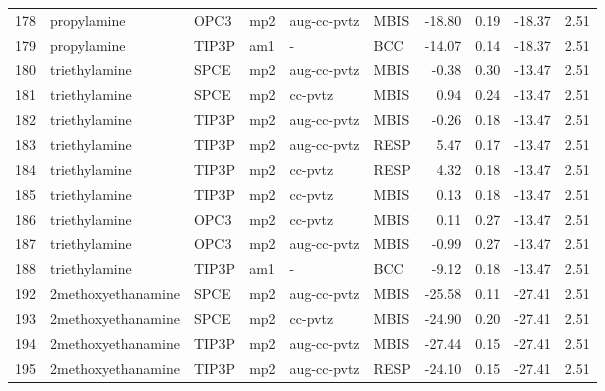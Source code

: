 \begin{tabular}{llllllrrrr}
178 &                    propylamine &       OPC3 &      mp2 &  aug-cc-pvtz &         MBIS & -18.80 &      0.19 &      -18.37 &     2.51 \\
179 &                    propylamine &      TIP3P &      am1 &            - &          BCC & -14.07 &      0.14 &      -18.37 &     2.51 \\
180 &                  triethylamine &       SPCE &      mp2 &  aug-cc-pvtz &         MBIS &  -0.38 &      0.30 &      -13.47 &     2.51 \\
181 &                  triethylamine &       SPCE &      mp2 &      cc-pvtz &         MBIS &   0.94 &      0.24 &      -13.47 &     2.51 \\
182 &                  triethylamine &      TIP3P &      mp2 &  aug-cc-pvtz &         MBIS &  -0.26 &      0.18 &      -13.47 &     2.51 \\
183 &                  triethylamine &      TIP3P &      mp2 &  aug-cc-pvtz &         RESP &   5.47 &      0.17 &      -13.47 &     2.51 \\
184 &                  triethylamine &      TIP3P &      mp2 &      cc-pvtz &         RESP &   4.32 &      0.18 &      -13.47 &     2.51 \\
185 &                  triethylamine &      TIP3P &      mp2 &      cc-pvtz &         MBIS &   0.13 &      0.18 &      -13.47 &     2.51 \\
186 &                  triethylamine &       OPC3 &      mp2 &      cc-pvtz &         MBIS &   0.11 &      0.27 &      -13.47 &     2.51 \\
187 &                  triethylamine &       OPC3 &      mp2 &  aug-cc-pvtz &         MBIS &  -0.99 &      0.27 &      -13.47 &     2.51 \\
188 &                  triethylamine &      TIP3P &      am1 &            - &          BCC &  -9.12 &      0.18 &      -13.47 &     2.51 \\
192 &             2methoxyethanamine &       SPCE &      mp2 &  aug-cc-pvtz &         MBIS & -25.58 &      0.11 &      -27.41 &     2.51 \\
193 &             2methoxyethanamine &       SPCE &      mp2 &      cc-pvtz &         MBIS & -24.90 &      0.20 &      -27.41 &     2.51 \\
194 &             2methoxyethanamine &      TIP3P &      mp2 &  aug-cc-pvtz &         MBIS & -27.44 &      0.15 &      -27.41 &     2.51 \\
195 &             2methoxyethanamine &      TIP3P &      mp2 &  aug-cc-pvtz &         RESP & -24.10 &      0.15 &      -27.41 &     2.51 \\

\end{tabular}
